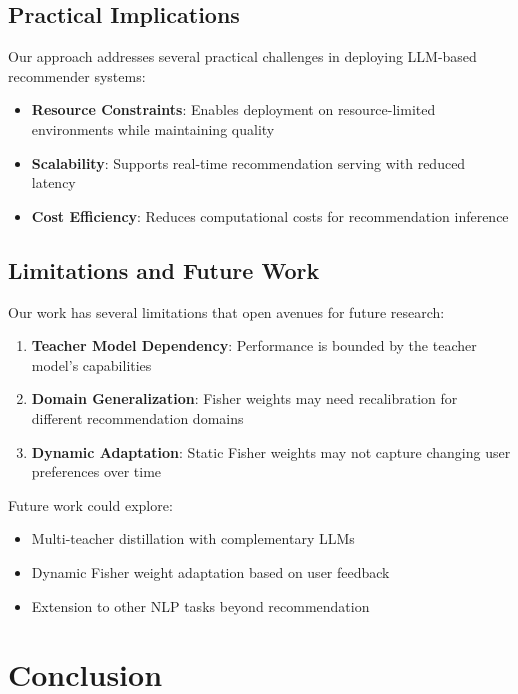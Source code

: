 \documentclass[10pt,conference]{IEEEtran}
\begin{document}
\subsection{Practical Implications}

Our approach addresses several practical challenges in deploying LLM-based recommender systems:

\begin{itemize}
    \item \textbf{Resource Constraints}: Enables deployment on resource-limited environments while maintaining quality
    \item \textbf{Scalability}: Supports real-time recommendation serving with reduced latency
    \item \textbf{Cost Efficiency}: Reduces computational costs for recommendation inference
\end{itemize}

\subsection{Limitations and Future Work}

Our work has several limitations that open avenues for future research:

\begin{enumerate}
    \item \textbf{Teacher Model Dependency}: Performance is bounded by the teacher model's capabilities
    \item \textbf{Domain Generalization}: Fisher weights may need recalibration for different recommendation domains
    \item \textbf{Dynamic Adaptation}: Static Fisher weights may not capture changing user preferences over time
\end{enumerate}

Future work could explore:
\begin{itemize}
    \item Multi-teacher distillation with complementary LLMs
    \item Dynamic Fisher weight adaptation based on user feedback
    \item Extension to other NLP tasks beyond recommendation
\end{itemize}

\section{Conclusion}
\end{document}
